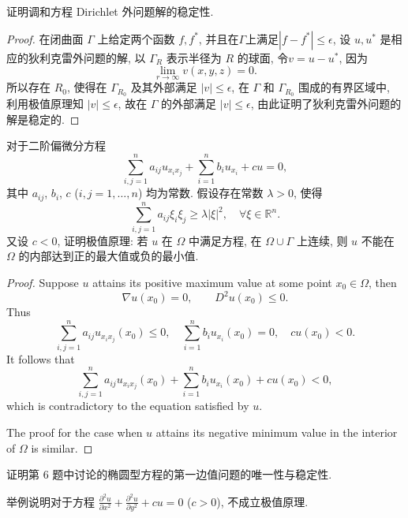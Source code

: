 \begin{exercise}
  证明调和方程 Dirichlet 外问题解的稳定性.
\end{exercise}

\begin{proof}
  在闭曲面 $\varGamma$ 上给定两个函数 $f,f^*$, 并且在$\varGamma$上满足$|f-f^*|\leq\epsilon$,
  设 $u,u^*$ 是相应的狄利克雷外问题的解, 以 $\varGamma_R$ 表示半径为 $R$ 的球面, 令$v=u-u^*$, 因为
  \[\lim_{r\to\infty}v(x,y,z)=0.\]
  所以存在 $R_0$, 使得在 $\varGamma_{R_0}$ 及其外部满足 $|v|\leq\epsilon$,
  在 $\varGamma$ 和 $\varGamma_{R_0}$ 围成的有界区域中,
  利用极值原理知 $|v|\leq\epsilon$, 故在 $\varGamma$ 的外部满足 $|v|\leq\epsilon$,
  由此证明了狄利克雷外问题的解是稳定的.
\end{proof}


\begin{exercise}
  对于二阶偏微分方程
  \[\sum_{i,j=1}^n a_{ij} u_{x_ix_j} + \sum_{i=1}^n b_i u_{x_i} + cu = 0,\]
  其中 $a_{ij}$, $b_i$, $c$ ($i,j=1,\dots,n$) 均为常数. 假设存在常数 $\lambda>0$, 使得
  \[\sum_{i,j=1}^n a_{ij}\xi_i\xi_j \geq \lambda |\xi|^2,\quad \forall\xi\in\mathbb{R}^n.\]
  又设 $c<0$, 证明极值原理: 若 $u$ 在 $\varOmega$ 中满足方程, 在 $\varOmega\cup\varGamma$ 上连续,
  则 $u$ 不能在 $\varOmega$ 的内部达到正的最大值或负的最小值.
\end{exercise}

\begin{proof}
  Suppose $u$ attains its positive maximum value at some point $x_0\in\varOmega$, then
  \[\nabla u(x_0) = 0,\qquad D^2 u(x_0)\leq 0.\]
  Thus
  \[\sum_{i,j=1}^n a_{ij} u_{x_ix_j}(x_0) \leq 0,
    \quad \sum_{i=1}^n b_i u_{x_i}(x_0) = 0,\quad cu(x_0)<0.\]
  It follows that
  \[\sum_{i,j=1}^n a_{ij} u_{x_ix_j}(x_0) + \sum_{i=1}^n b_i u_{x_i}(x_0) + cu(x_0) <0,\]
  which is contradictory to the equation satisfied by $u$.

  The proof for the case when $u$ attains its negative minimum value in the interior of
  $\varOmega$ is similar.
\end{proof}


\begin{exercise}
  证明第 6 题中讨论的椭圆型方程的第一边值问题的唯一性与稳定性.
\end{exercise}


\begin{exercise}
  举例说明对于方程 $\frac{\partial^2u}{\partial x^2} + \frac{\partial^2 u}{\partial y^2} + cu = 0$
  ($c>0$), 不成立极值原理.
\end{exercise}

